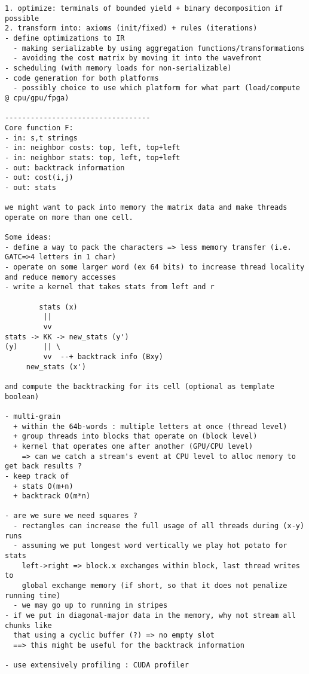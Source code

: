 \documentclass[11pt]{article}
\begin{document}
\begin{verbatim}
1. optimize: terminals of bounded yield + binary decomposition if possible
2. transform into: axioms (init/fixed) + rules (iterations)
- define optimizations to IR
  - making serializable by using aggregation functions/transformations
  - avoiding the cost matrix by moving it into the wavefront
- scheduling (with memory loads for non-serializable)
- code generation for both platforms
  - possibly choice to use which platform for what part (load/compute @ cpu/gpu/fpga)

----------------------------------
Core function F:
- in: s,t strings
- in: neighbor costs: top, left, top+left
- in: neighbor stats: top, left, top+left
- out: backtrack information
- out: cost(i,j)
- out: stats

we might want to pack into memory the matrix data and make threads operate on more than one cell.

Some ideas:
- define a way to pack the characters => less memory transfer (i.e. GATC=>4 letters in 1 char)
- operate on some larger word (ex 64 bits) to increase thread locality and reduce memory accesses
- write a kernel that takes stats from left and r

        stats (x)
         ||
         vv
stats -> KK -> new_stats (y')
(y)      || \
         vv  --+ backtrack info (Bxy)
     new_stats (x')

and compute the backtracking for its cell (optional as template boolean)

- multi-grain
  + within the 64b-words : multiple letters at once (thread level)
  + group threads into blocks that operate on (block level)
  + kernel that operates one after another (GPU/CPU level)
    => can we catch a stream's event at CPU level to alloc memory to get back results ?
- keep track of
  + stats O(m+n)
  + backtrack O(m*n)

- are we sure we need squares ?
  - rectangles can increase the full usage of all threads during (x-y) runs
  - assuming we put longest word vertically we play hot potato for stats
    left->right => block.x exchanges within block, last thread writes to
    global exchange memory (if short, so that it does not penalize running time)
  - we may go up to running in stripes
- if we put in diagonal-major data in the memory, why not stream all chunks like
  that using a cyclic buffer (?) => no empty slot
  ==> this might be useful for the backtrack information

- use extensively profiling : CUDA profiler


\end{verbatim}
\end{document}
